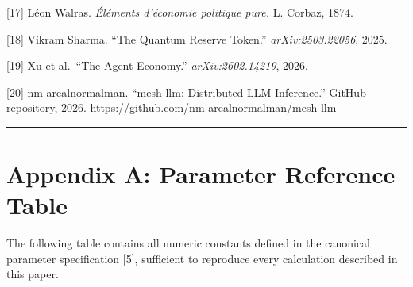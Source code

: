 \documentclass[
  11pt,
]{article}
\begin{document}
{[}17{]} Léon Walras. \emph{Éléments d'économie politique pure.} L.
Corbaz, 1874.

{[}18{]} Vikram Sharma. ``The Quantum Reserve Token.''
\emph{arXiv:2503.22056}, 2025.

{[}19{]} Xu et al.~``The Agent Economy.'' \emph{arXiv:2602.14219}, 2026.

{[}20{]} nm-arealnormalman. ``mesh-llm: Distributed LLM Inference.''
GitHub repository, 2026. https://github.com/nm-arealnormalman/mesh-llm

\begin{center}\rule{0.5\linewidth}{0.5pt}\end{center}

\section{Appendix A: Parameter Reference
Table}\label{appendix-a-parameter-reference-table}

The following table contains all numeric constants defined in the
canonical parameter specification {[}5{]}, sufficient to reproduce every
calculation described in this paper.
\end{document}
